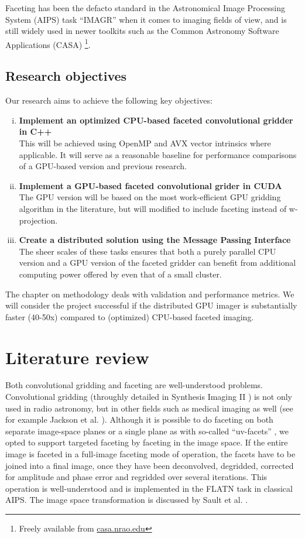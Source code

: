 \documentclass[a4paper, two column]{article}
\begin{document}
Faceting has been the defacto standard in the Astronomical Image Processing System (AIPS) task ``IMAGR'' \cite{AIPS113} when it comes to imaging fields of view, and is still 
widely used in newer toolkits such as the Common Astronomy Software Applications (CASA) \footnote{Freely available from \url{casa.nrao.edu}}. 

\subsection{Research objectives}
Our research aims to achieve the following key objectives:
\begin{enumerate}[i)]
 \item \textbf{Implement an optimized CPU-based faceted convolutional gridder in C++}\\
  This will be achieved using OpenMP and AVX vector intrinsics where applicable. It will serve as a reasonable baseline for performance comparisons of a GPU-based version and previous research.
 \item \textbf{Implement a GPU-based faceted convolutional grider in CUDA}\\
  The GPU version will be based on the most work-efficient GPU gridding algorithm in the literature, but will modified to include faceting instead of w-projection.
 \item \textbf{Create a distributed solution using the Message Passing Interface}\\
  The sheer scales of these tasks ensures that both a purely parallel CPU version and a GPU version of the faceted gridder can benefit from additional computing power offered by even that of a small cluster.
\end{enumerate}

The chapter on methodology deals with validation and performance metrics. We will consider the project successful if the distributed GPU imager is substantially faster (40-50x) compared to (optimized) CPU-based 
faceted imaging.
\section{Literature review}
 Both convolutional gridding and faceting are well-understood problems. Convolutional gridding (throughly detailed in Synthesis Imaging II \cite{taylor1999synthesis}) is not only used in radio astronomy, but in other fields such as 
 medical imaging as well (see for example Jackson et al. \cite{jackson1991selection}). Although it is possible to do faceting on both separate image-space planes \cite{cornwell1992radio} or a single plane as with so-called ``uv-facets'' \cite{AIPS113}, we opted to support targeted 
 faceting by faceting in the image space. If the entire image is faceted in a full-image faceting mode of operation, the facets have to be joined into a final image, once they have been deconvolved, degridded, corrected for amplitude and phase error and regridded over several iterations. 
 This operation is well-understood and is implemented in the FLATN task in classical AIPS. The image space transformation is discussed by Sault et al. \cite{sault1996approach}.
 
\end{document}
